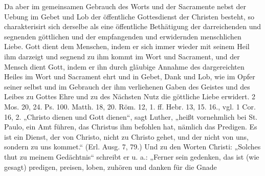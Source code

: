 Da aber im gemeinsamen Gebrauch des Worts und der Sacramente nebst der Uebung im Gebet und Lob der öffentliche Gottesdienst der Christen besteht, so charakterisirt sich derselbe als eine öffentliche Bethätigung der darreichenden und segnenden göttlichen und der empfangenden und erwidernden menschlichen Liebe. Gott dient dem Menschen, indem er sich immer wieder mit seinem Heil ihm darzeigt und segnend zu ihm kommt im Wort und Sacrament, und der Mensch dient Gott, indem er ihn durch gläubige Annahme des dargereichten Heiles im Wort und Sacrament ehrt und in Gebet, Dank und Lob, wie im Opfer seiner selbst und im Gebrauch der ihm verliehenen Gaben des Geistes und des Leibes zu Gottes Ehre und zu des Nächsten Nutz die göttliche Liebe erwidert. 2 Mos. 20, 24. Ps. 100. Matth. 18, 20. Röm. 12, 1. ff. Hebr. 13, 15. 16., vgl. 1 Cor. 16, 2. „Christo dienen und Gott dienen“, sagt Luther, „heißt vornehmlich bei St. Paulo, ein Amt führen, das Christus ihm befohlen hat, nämlich das Predigen. Es ist ein Dienst, der von Christo, nicht zu Christo gehet, und der nicht von uns, sondern zu uns kommet.“ (Erl. Ausg. 7, 79.) Und zu den Worten Christi: „Solches thut zu meinem Gedächtnis“ schreibt er u. a.: „Ferner sein gedenken, das ist (wie gesagt) predigen, preisen, loben, zuhören und danken für die Gnade
